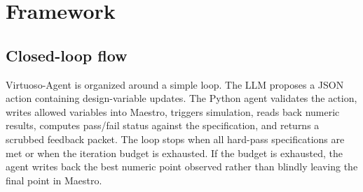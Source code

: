 \documentclass[acmsmall,review,anonymous]{acmart}
\newcommand{\framework}{Virtuoso-Agent}
\begin{document}
\section{Framework}
\label{sec:framework}

\subsection{Closed-loop flow}

\framework{} is organized around a simple loop. The LLM proposes a JSON action
containing design-variable updates. The Python agent validates the action,
writes allowed variables into Maestro, triggers simulation, reads back numeric
results, computes pass/fail status against the specification, and returns a
scrubbed feedback packet. The loop stops when all hard-pass specifications are
met or when the iteration budget is exhausted. If the budget is exhausted, the
agent writes back the best numeric point observed rather than blindly leaving
the final point in Maestro.
\end{document}
